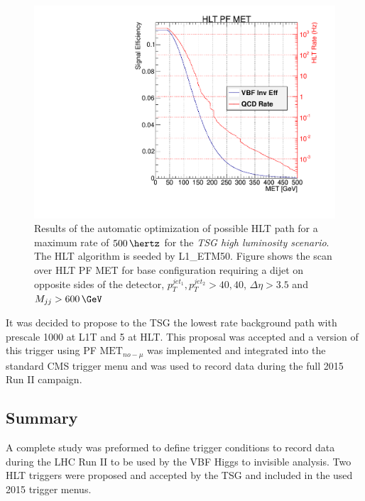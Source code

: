 \begin{figure}[!htp]%
\centering
\includegraphics[width=0.55\linewidth]{Chapter08/TriggerStudies/HLT/Systematics/L1ETM50_HLT_DijetVBF40_DEta3p5_MJJ600.pdf}
\caption{Results of the automatic optimization of possible \gls{HLT} path for a maximum rate of $500\,\hertz$ for the \textit{\gls{TSG} high luminosity scenario}. The \gls{HLT} algorithm is seeded by L1\_ETM50. Figure shows the scan over \gls{HLT} \gls{PF} \gls{MET} for base configuration requiring a dijet on opposite sides of the detector, $p_T^{jet_1},p_T^{jet_2}>40,40$, $\Delta\eta>3.5$ and $M_{jj}>600\,\GeV$}
\label{FIGURE:RunIITriggerStudies_SystematicsPath}
\end{figure}

It was decided to propose to the \gls{TSG} the lowest rate background path with prescale 1000 at \gls{L1T} and 5 at \gls{HLT}. This proposal was accepted and a version of this trigger using \gls{PF} $\text{MET}_{no-\mu}$ was implemented and integrated into the standard \gls{CMS} trigger menu and was used to record data during the full 2015 Run II campaign.

\subsection{Summary}
\label{SUBSECTION:RunIIPreparation_Summary}


A complete study was preformed to define trigger conditions to record data during the \gls{LHC} Run II to be used by the \gls{VBF} Higgs to invisible analysis. Two \gls{HLT} triggers were proposed and accepted by the \gls{TSG} and included in the used 2015 trigger menus. 

